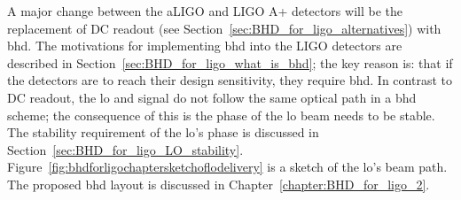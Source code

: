 A major change between the aLIGO and LIGO A+ detectors will be the replacement of DC readout (see Section~\ref{sec:BHD_for_ligo_alternatives}) with \gls{bhd}. The motivations for implementing \gls{bhd} into the LIGO detectors are described in Section~\ref{sec:BHD_for_ligo_what_is_bhd}; the key reason is: that if the detectors are to reach their design sensitivity, they require \gls{bhd}. In contrast to DC readout, the \gls{lo} and signal do not follow the same optical path in a \gls{bhd} scheme; the consequence of this is the phase of the \gls{lo} beam needs to be stable. The stability requirement of the \gls{lo}'s phase is discussed in Section~\ref{sec:BHD_for_ligo_LO_stability}. Figure~\ref{fig:bhdforligochaptersketchoflodelivery} is a sketch of the \gls{lo}'s beam path. The proposed \gls{bhd} layout is discussed in Chapter~\ref{chapter:BHD_for_ligo_2}.
\par
